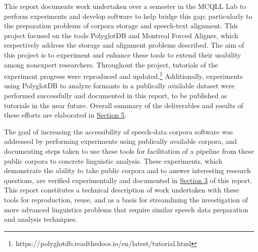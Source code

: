 \documentclass[11pt]{article}
\begin{document}
This report documents work undertaken over a semester in the MCQLL Lab to perform experiments and develop software to help bridge this gap; particularly to the preparation problems of corpora storage and speech-text alignment. This project focused on the tools PolyglotDB\cite{mcauliffe_polyglot_2017} and Montreal Forced Aligner\cite{mcauliffe_montreal_nodate}, which respectively address the storage and alignment problems described. The aim of this project is to experiment and enhance these tools to extend their usability among nonexpert researchers. Throughout the project, tutorials of the experiment progress were reproduced and updated.\footnote{https://polyglotdb.readthedocs.io/en/latest/tutorial.html} Additionally, experiments using PolyglotDB to analyze formants in a publically available dataset were performed successfully and documented in this report, to be published as tutorials in the near future. Overall summary of the deliverables and results of these efforts are elaborated in \hyperlink{section.5}{Section 5}.

The goal of increasing the accessibility of speech-data corpora software was addressed by performing experiments using publically available corpora, and documenting steps taken to use these tools for facilitation of a pipeline from these public corpora to concrete linguistic analysis. These experiments, which demonstrate the ability to take public corpora and to answer interesting research questions, are verified experimentally and documented in \hyperlink{section.3}{Section 3} of this report. This report constitutes a technical description of work undertaken with these tools for reproduction, reuse, and as a basis for streamlining the investigation of more advanced linguistics problems that require similar speech data preparation and analysis techniques.
\end{document}
